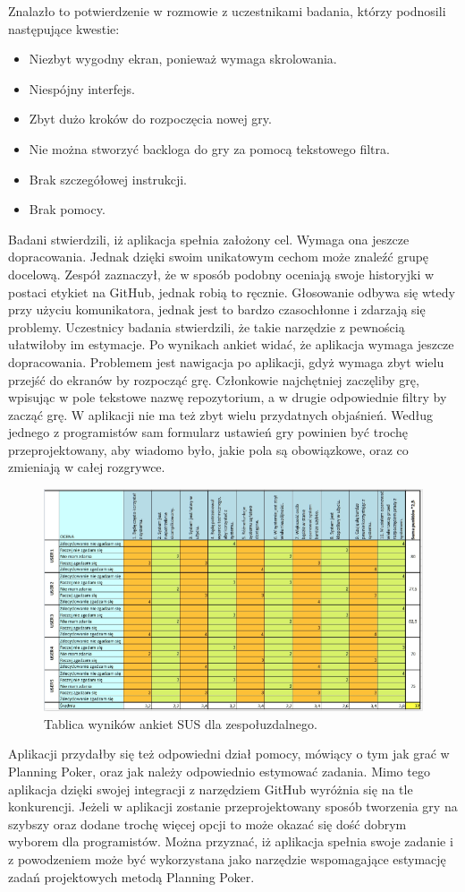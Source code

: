 Znalazło to potwierdzenie w rozmowie z uczestnikami badania, którzy podnosili następujące kwestie:
\begin{itemize}
	\item Niezbyt wygodny ekran, ponieważ wymaga skrolowania.
	\item Niespójny interfejs.
	\item Zbyt dużo kroków do rozpoczęcia nowej gry.
	\item Nie można stworzyć backloga do gry za pomocą tekstowego filtra.
	\item Brak szczegółowej instrukcji.
	\item Brak pomocy.
\end{itemize}
Badani stwierdzili, iż aplikacja spełnia założony cel. Wymaga ona jeszcze dopracowania. Jednak dzięki
swoim unikatowym cechom może znaleźć grupę docelową.
Zespół zaznaczył, że w sposób podobny oceniają swoje historyjki w postaci etykiet na GitHub, jednak
robią to ręcznie. Głosowanie odbywa się wtedy przy użyciu komunikatora, jednak jest to bardzo czasochłonne i
zdarzają się problemy. Uczestnicy badania stwierdzili, że takie narzędzie z pewnością ułatwiłoby im estymacje.
Po wynikach ankiet widać, że aplikacja wymaga jeszcze dopracowania. Problemem jest nawigacja po
aplikacji, gdyż wymaga zbyt wielu przejść do ekranów by rozpocząć grę. Członkowie najchętniej zaczęliby grę,
wpisując w pole tekstowe nazwę repozytorium, a w drugie odpowiednie filtry by zacząć grę. W aplikacji nie ma
też zbyt wielu przydatnych objaśnień. Według jednego z programistów sam formularz ustawień gry powinien
być trochę przeprojektowany, aby wiadomo było, jakie pola są obowiązkowe, oraz co zmieniają w całej
rozgrywce.
\begin{figure}[H]
	\centering\includegraphics[width=\textwidth]{img/Badanie2.png}
	\caption{Tablica wyników ankiet SUS dla zespołuzdalnego.}\label{rys:badanie2}%
\end{figure}
Aplikacji przydałby się też odpowiedni dział pomocy, mówiący o tym jak grać w Planning Poker, oraz jak
należy odpowiednio estymować zadania. Mimo tego aplikacja dzięki swojej integracji z narzędziem GitHub
wyróżnia się na tle konkurencji. Jeżeli w aplikacji zostanie przeprojektowany sposób tworzenia gry na szybszy
oraz dodane trochę więcej opcji to może okazać się dość dobrym wyborem dla programistów.
Można przyznać, iż aplikacja spełnia swoje zadanie i z powodzeniem może być wykorzystana jako
narzędzie wspomagające estymację zadań projektowych metodą Planning Poker.
